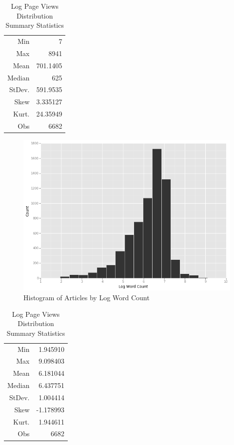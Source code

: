 \documentclass[fleqn,12pt]{SelfArx} %
\begin{document}
\begin{table}[hbt]
\caption{Log Page Views Distribution Summary Statistics}
\centering
\begin{tabular}{rr}
\toprule
Min               &  7\\
Max               &  8941\\  
Mean              &  701.1405\\
Median            &  625\\
StDev.            &  591.9535\\
Skew              &  3.335127\\
Kurt.             &  24.35949\\
\midrule
Obs &  6682\\
\bottomrule
\end{tabular}
\end{table}

\begin{figure}[ht]\centering
\includegraphics[width=\linewidth]{log_wordcount_hist}
\caption{Histogram of Articles by Log Word Count}
\label{fig:lpv_hist}
\end{figure}

\begin{table}[hbt]
\caption{Log Page Views Distribution Summary Statistics}
\centering
\begin{tabular}{rr}
\toprule
Min               &  1.945910\\
Max               &  9.098403\\  
Mean              &  6.181044\\
Median            &  6.437751\\
StDev.            &  1.004414\\
Skew              &  -1.178993\\
Kurt.             &  1.944611\\
\midrule
Obs &  6682\\
\bottomrule
\end{tabular}
\end{table}
\end{document}
